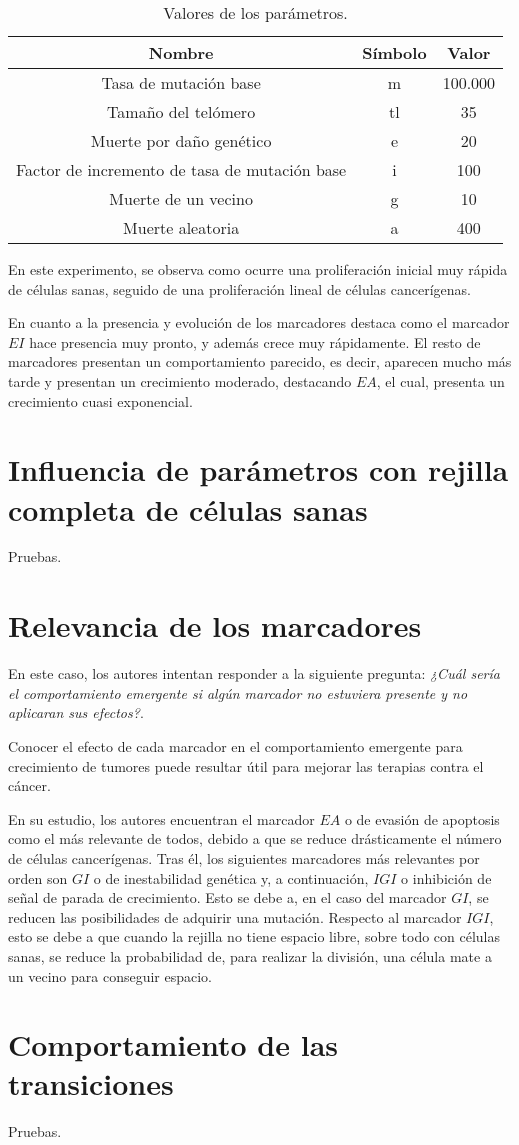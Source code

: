 \begin{table}[h!]
  \centering
  \caption{Valores de los parámetros.}
  \label{tab:table1}
  \begin{tabular}{ccc}
    \toprule
    Nombre & Símbolo & Valor\\
    \midrule
    Tasa de mutación base & m & 100.000\\
    Tamaño del telómero & tl & 35\\
    Muerte por daño genético & e & 20\\
    Factor de incremento de tasa de mutación base & i & 100\\
    Muerte de un vecino & g & 10\\
    Muerte aleatoria & a & 400\\
    \bottomrule
  \end{tabular}
\end{table}

En este experimento, se observa como ocurre una proliferación inicial muy rápida
de células sanas, seguido de una proliferación lineal de células cancerígenas.

En cuanto a la presencia y evolución de los marcadores destaca como el marcador $EI$ hace
presencia muy pronto, y además crece muy rápidamente. El resto de marcadores presentan un
comportamiento parecido, es decir, aparecen mucho más tarde y presentan un crecimiento moderado,
destacando $EA$, el cual, presenta un crecimiento cuasi exponencial.

\section{Influencia de parámetros con rejilla completa de células sanas}

Pruebas.

\section{Relevancia de los marcadores}

En este caso, los autores intentan responder a la siguiente pregunta: \textit{¿Cuál sería
el comportamiento emergente si algún marcador no estuviera presente y no aplicaran
sus efectos?}.

Conocer el efecto de cada marcador en el comportamiento emergente para crecimiento de tumores
puede resultar útil para mejorar las terapias contra el cáncer.

En su estudio, los autores encuentran el marcador $EA$ o de evasión de apoptosis como el más
relevante de todos, debido a que se reduce drásticamente el número de células cancerígenas.
Tras él, los siguientes marcadores más relevantes por orden son $GI$ o de inestabilidad genética y,
a continuación, $IGI$ o inhibición de señal de parada de crecimiento. Esto se debe a, en el caso
del marcador $GI$, se reducen las posibilidades de adquirir una mutación. Respecto al marcador $IGI$,
esto se debe a que cuando la rejilla no tiene espacio libre, sobre todo con células sanas, se reduce
la probabilidad de, para realizar la división, una célula mate a un vecino para conseguir espacio.

\section{Comportamiento de las transiciones}

Pruebas.
